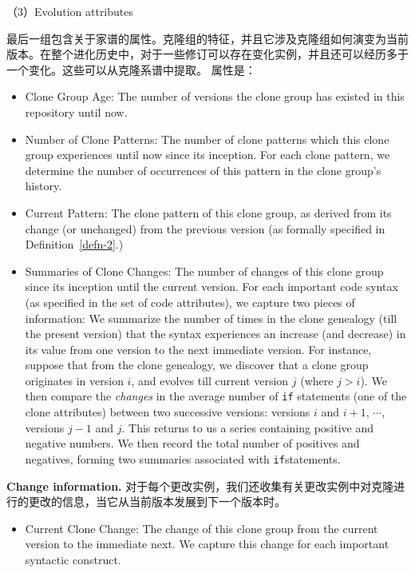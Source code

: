 （3）Evolution attributes

最后一组包含关于家谱的属性。克隆组的特征，并且它涉及克隆组如何演变为当前版本。在整个进化历史中，对于一些修订可以存在变化实例，并且还可以经历多于一个变化。这些可以从克隆系谱中提取。 属性是：

\begin{itemize}
\item Clone Group Age: 
The number of versions the clone group has existed in this repository until now.

\item Number of Clone Patterns: 
The number of clone patterns which this clone group experiences until now since its inception. 
For each clone pattern, we determine the number of occurrences of this pattern in the clone group's history.

\item Current Pattern: 
The clone pattern of this clone group, as derived from its change (or unchanged) from the previous version (as formally specified in Definition~\ref{defn-2}.)

\item Summaries of Clone Changes: 
The number of changes of this clone group since its inception until the current version.
For each important code syntax (as specified in the set of code attributes), we capture two pieces of information: We summarize the number of times in the clone genealogy (till the present version) that the syntax experiences an increase (and decrease) in its value from one version to the next immediate version. 
For instance, suppose that from the clone genealogy, we discover that a clone group originates in version $i$, and evolves till current version $j$ (where $j > i$). 
We then compare the {\em changes} in the average number of \verb+if+ statements (one of the clone attributes) between two successive versions: versions $i$ and $i+1$, $\cdots$, versions  $j-1$ and $j$. 
This returns to us a series containing positive and negative numbers.
We then record the total number of positives and negatives, forming two summaries associated with \verb+if+statements.
\end{itemize}

\noindent
{\bf Change information.} 
对于每个更改实例，我们还收集有关更改实例中对克隆进行的更改的信息，当它从当前版本发展到下一个版本时。

\begin{itemize}
\item Current Clone Change: 
The change of this clone group from the current version to the immediate next.  
We capture this change for each important syntactic construct.
\end{itemize}

